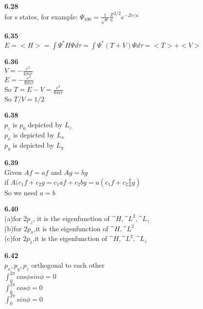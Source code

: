 \documentclass{article}
\begin{document}
\textbf{6.28}\\
for s states, for example: $\Psi_{100} = \frac{1}{\sqrt{\pi}}\frac{Z}{a}^{3/2}e^{-Zr/a}$\\
\newline

\textbf{6.35}\\
$E= <H> = \int \Psi^* H\Psi d\tau = \int \Psi^*(T+V)\Psi d\tau = <T>+ <V>$\\
\newline

\textbf{6.36}\\
$V = -\frac{e^2}{4\pi \epsilon r}$\\
$E = -\frac{e^2}{8 \pi \epsilon r}$\\
So $T = E - V = \frac{e^2}{8\pi \epsilon r}$\\
So $T/V = 1/2$\\
\newline

\textbf{6.38}\\
$p_z$ is $p_0$ depicted by $L_z$\\
$p_x$ is depicted by $L_x$\\
$p_y$ is depicted by $L_y$\\
\newline

\textbf{6.39}\\
Given $Af = af$ and $Ag = bg$\\
if $A(c_1f+c_2g = c_1af+c_2bg = a(c_1f+c_2\frac{b}{a}g)$\\
So we need $a=b$\\
\newline

\textbf{6.40}\\
(a)for $2p_z$, it is the eigenfunction of $\^{H},\^{L}^2,\^{L}_z$\\
(b)for $2p_x$,it is the eigenfunction of $\^{H},\^{L}^2$\\
(c)for $2p_1$,it is the eigenfunction of $\^{H},\^{L}^2,\^{L}_z$\\
\newline

\textbf{6.42}\\
$p_x, p_y, p_z$ orthogonal to each other\\
$\int_0^{2\pi} cos\phi sin \phi = 0$\\
$\int_0^{2\pi}cos\phi = 0$\\
$\int_0^{2\pi}sin\phi = 0$\\
\newline
\end{document}
